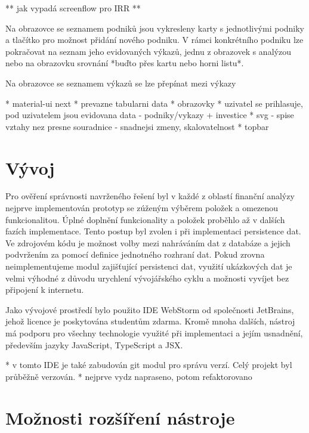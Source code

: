 ** jak vypadá screenflow pro IRR **

Na obrazovce se seznamem podniků jsou vykresleny karty s jednotlivými podniky a tlačítko pro možnost přidání nového podniku. V rámci konkrétního podniku lze pokračovat na seznam jeho evidovaných výkazů, jednu z obrazovek s analýzou nebo na obrazovku srovnání *buďto přes kartu nebo horni listu*. 

Na obrazovce se seznamem výkazů se lze přepínat mezi výkazy 


* material-ui next
* prevazne tabularni data
* obrazovky
* uzivatel se prihlasuje, pod uzivatelem jsou evidovana data - podniky/vykazy + investice
* svg - spise vztahy nez presne souradnice - snadnejsi zmeny, skalovatelnost
* topbar


\section{Vývoj}
Pro ověření správnosti navrženého řešení byl v každé z oblastí finanční analýzy nejprve implementován prototyp se zúženým výběrem položek a omezenou funkcionalitou. Úplné doplnění funkcionality a položek proběhlo až v dalších fazích implementace. Tento postup byl zvolen i při implementaci persistence dat. Ve zdrojovém kódu je možnost volby mezi nahráváním dat z databáze a jejich podvržením za pomocí definice jednotného rozhraní dat. Pokud zrovna neimplementujeme modul zajišťující persistenci dat, využití ukázkových dat je velmi výhodné z důvodu urychlení vývojářského cyklu a možnosti vyvíjet bez připojení k internetu.

Jako vývojové prostředí bylo použito IDE WebStorm od společnosti JetBrains, jehož licence je poskytována studentům zdarma. Kromě mnoha dalších, nástroj má podporu pro všechny technologie využité při implementaci a jejím usnadnění, především jazyky JavaScript, TypeScript a JSX.

* v tomto IDE je také zabudován git modul pro správu verzí. Celý projekt byl průběžně verzován.
* nejprve vydz napraseno, potom refaktorovano

\section{Možnosti rozšíření nástroje}

